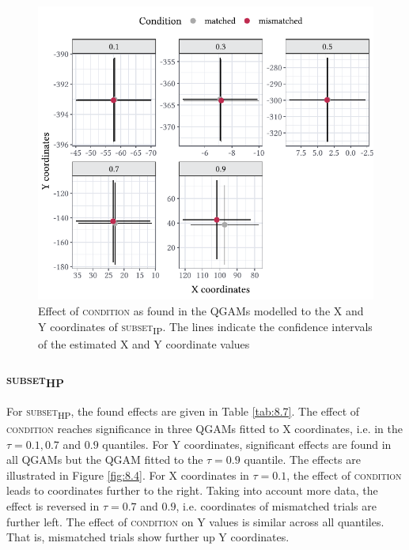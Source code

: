 \begin{figure}
    \centering
    \includegraphics[]{figures/fig8.3.pdf}
    \caption{Effect of \textsc{condition} as found in the QGAMs modelled to the X and Y coordinates of \textsc{subset\textsubscript{IP}}. The lines indicate the confidence intervals of the estimated X and Y coordinate values}
    \label{fig:8_3}
\end{figure}

\subsubsection{\textsc{subset\textsubscript{HP}}}\label{section08_2_2_2}

For \textsc{subset\textsubscript{HP}}, the found effects are given in Table \ref{tab:8.7}. The effect of \textsc{condition} reaches significance in three QGAMs fitted to X coordinates, i.e. in the $\tau=0.1,0.7$ and $0.9$ quantiles. For Y coordinates, significant effects are found in all QGAMs but the QGAM fitted to the $\tau=0.9$ quantile. The effects are illustrated in Figure \ref{fig:8.4}. For X coordinates in $\tau=0.1$, the effect of \textsc{condition} leads to coordinates further to the right. Taking into account more data, the effect is reversed in $\tau=0.7$ and $0.9$, i.e. coordinates of mismatched trials are further left. The effect of \textsc{condition} on Y values is similar across all quantiles. That is, mismatched trials show further up Y coordinates.

